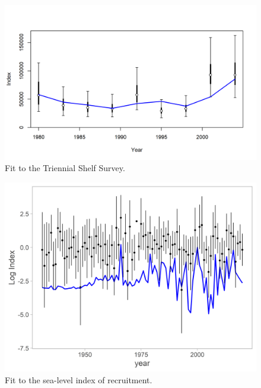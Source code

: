 \documentclass[11pt,
  english,
  a4paper,
]{article}
\begin{document}
\begin{figure}
\centering
\includegraphics[width=1\textwidth,height=1\textheight]{figs/index2_cpuefit_AKSHLF.png}
\caption{Fit to the Triennial Shelf Survey.\label{fig:ind_AFSC}}
\end{figure}

\tagmcend\tagstructend


\begin{figure}
\centering
\includegraphics[width=1\textwidth,height=1\textheight]{figs/index2_cpuefit_ENV_log.png}
\caption{Fit to the sea-level index of recruitment.\label{fig:ind_ENV}}
\end{figure}

\tagmcend\tagstructend

\end{document}
